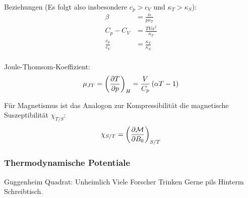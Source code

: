 \documentclass[11pt]{article}
\numberwithin{equation}{section}
\begin{document}
				\noindent
				Beziehungen (Es folgt also insbesondere $c_p > c_V$ und
				$\kappa_T > \kappa_S$):
				\begin{equation}
					\begin{aligned}
						\beta &= \frac{\alpha}{p \kappa_T} \\
						C_p - C_V &= \frac{TV\alpha^2}{\kappa_T} \\
						\frac{c_p}{c_V} &= \frac{\kappa_T}{\kappa_S} \\
					\end{aligned}
				\end{equation}

				\noindent
				Joule-Thomsom-Koeffizient:
				\begin{equation}
					\mu_{JT} = \left( \frac{\partial T}{\partial p} \right)_H = \frac{V}{C_p}\left(\alpha T - 1\right)
				\end{equation}

				\noindent
				Für Magnetismus ist das Analogon zur Kompressibilität die magnetische Suszeptibilität $\chi_{T/S}$:
				\begin{equation}
					\chi_{S/T} = \left(\frac{\partial \mathcal{M}}{\partial B_0}\right)_{S/T}
				\end{equation}

			\subsubsection{Thermodynamische Potentiale}
				\noindent
				Guggenheim Quadrat:
				Unheimlich Viele Forscher Trinken Gerne pils Hinterm Schreibtisch.
\end{document}
